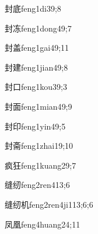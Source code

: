 \begin{verbete}{封底}{feng1di3}{9;8}
\end{verbete}

\begin{verbete}{封冻}{feng1dong4}{9;7}
\end{verbete}

\begin{verbete}{封盖}{feng1gai4}{9;11}
\end{verbete}

\begin{verbete}{封建}{feng1jian4}{9;8}
\end{verbete}

\begin{verbete}{封口}{feng1kou3}{9;3}
\end{verbete}

\begin{verbete}{封面}{feng1mian4}{9;9}
\end{verbete}

\begin{verbete}{封印}{feng1yin4}{9;5}
\end{verbete}

\begin{verbete}{封斋}{feng1zhai1}{9;10}
\end{verbete}

\begin{verbete}{疯狂}{feng1kuang2}{9;7}
\end{verbete}

\begin{verbete}{缝纫}{feng2ren4}{13;6}
\end{verbete}

\begin{verbete}{缝纫机}{feng2ren4ji1}{13;6;6}
\end{verbete}

\begin{verbete}{凤凰}{feng4huang2}{4;11}
\end{verbete}

